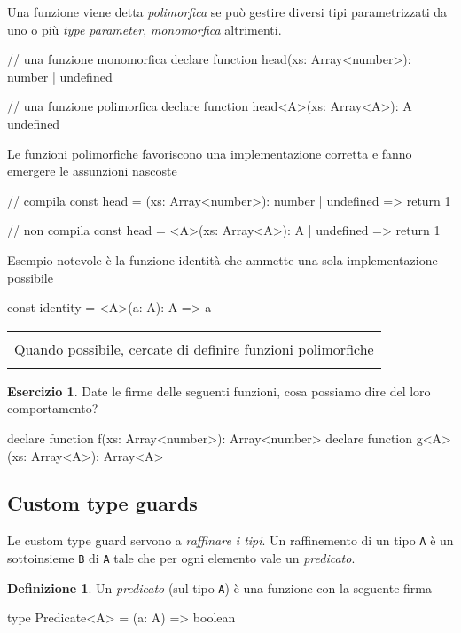 \documentclass[12pt]{article}
\theoremstyle{definition}
\newtheorem{definition}{Definizione}[section]
\newtheorem{exercise}{Esercizio}[subsection]
\newenvironment{boxed}
    {\begin{center}
    \begin{tabular}{|p{0.9\textwidth}|}
    \hline\\
    }
    {
    \\\\\hline
    \end{tabular}
    \end{center}
    }
\newenvironment{code}
  {\vspace{0.5cm} \VerbatimEnvironment\begin{typescriptcode}}
  {\end{typescriptcode} \vspace{0.2cm}}
\begin{document}
Una funzione viene detta \emph{polimorfica} se può gestire diversi tipi parametrizzati da uno o più \emph{type parameter},
\emph{monomorfica} altrimenti.

\begin{code}
// una funzione monomorfica
declare function head(xs: Array<number>): number | undefined

// una funzione polimorfica
declare function head<A>(xs: Array<A>): A | undefined
\end{code}

Le funzioni polimorfiche favoriscono una implementazione corretta e fanno emergere le assunzioni nascoste

\begin{code}
// compila
const head = (xs: Array<number>): number | undefined => {
  return 1
}

// non compila
const head = <A>(xs: Array<A>): A | undefined => {
  return 1
}
\end{code}

Esempio notevole è la funzione identità che ammette una sola implementazione possibile

\begin{code}
const identity = <A>(a: A): A => a
\end{code}

\begin{boxed}
Quando possibile, cercate di definire funzioni polimorfiche
\end{boxed}

\begin{exercise}
Date le firme delle seguenti funzioni, cosa possiamo dire del loro comportamento?

\begin{code}
declare function f(xs: Array<number>): Array<number>
declare function g<A>(xs: Array<A>): Array<A>
\end{code}
\end{exercise}

\subsection{Custom type guards}

Le custom type guard servono a \emph{raffinare i tipi}. Un raffinemento di un tipo \texttt{A} è un sottoinsieme \texttt{B} di \texttt{A}
tale che per ogni elemento vale un \emph{predicato}.

\begin{definition}
Un \emph{predicato} (sul tipo \texttt{A}) è una funzione con la seguente firma

\begin{code}
type Predicate<A> = (a: A) => boolean
\end{code}
\end{definition}
\end{document}
